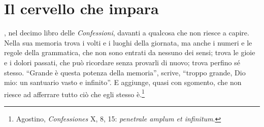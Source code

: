 %
\chapter{Il cervello che impara}
\label{cap:cervello}


, nel decimo libro delle
\emph{Confessioni}, davanti a qualcosa che non riesce a capire. Nella
sua memoria trova i volti e i luoghi della giornata, ma anche i numeri
e le regole della grammatica, che non sono entrati da nessuno dei
sensi; trova le gioie e i dolori passati, che può ricordare senza
provarli di nuovo; trova perfino sé stesso. \enquote{Grande è questa
potenza della memoria}, scrive, \enquote{troppo grande, Dio mio: un
santuario vasto e infinito}. E aggiunge, quasi con sgomento, che non
riesce ad afferrare tutto ciò che egli stesso è.\footnote{Agostino,
\emph{Confessiones} X, 8, 15: \emph{penetrale amplum et infinitum}.}

